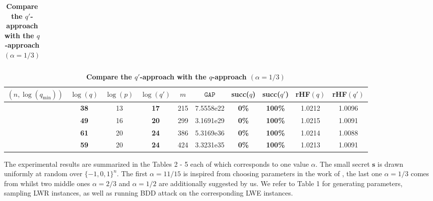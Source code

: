 \documentclass[runningheads]{llncs}
\begin{document}
\begin{table}[pt]
\begin{tabular}{| c | c | c | c | c | c | c | c | c| c|}
	\end{tabular}
	\label{table:4}
	
	
	\caption{\textbf{Compare the $q'$-approach with the $q$-approach $(\alpha=1/3)$}}  
	\centering
	\begin{tabular}{| c | c | c | c | c | c | c | c | c| c|}
		
		\hline
		\hline
		$(n, \log (q_{\text{min}}))$& $\log (q)$ & $\log (p)$  & $\log (q')$ & $m$  &$\mathtt{GAP}$& succ($q$) & succ($q'$)&rHF$(q)$&rHF$(q')$\\	
		\hline
		\hline
		\parbox[t]{13mm}{}&\textbf{38}	&13&\textbf{17}&215&7.5558e22&\textbf{0\%}&\textbf{100\%}&1.0212&1.0096\\
		
		\hline
	
	\parbox[t]{13mm}{}	&\textbf{49}&16&\textbf{20}&299&3.1691e29&\textbf{0\%}&\textbf{100\% }&1.0215&1.0091\\	
		\hline
		\parbox[t]{13mm}{}&\textbf{61}&20&\textbf{24}&386&5.3169e36&\textbf{0\%}&\textbf{100\% }&1.0214&1.0088\\		
		\hline
	\parbox[t]{13mm}{}&\textbf{59}&20&\textbf{24}&424&3.3231e35&\textbf{0\%}&\textbf{100\% }&1.0213&1.0091\\	

		\hline	
	\end{tabular}
	\label{table:5}
\end{table}


The experimental results are summarized in the Tables 2 - 5 each of which corresponds to one value $\alpha$.
The small secret $\mathbf{s}$ is drawn uniformly at random over $\{-1,0,1\}^n$. The first $\alpha=11/15$ is inspired from choosing parameters in the work of \cite{BBGM+17}, the last one $\alpha=1/3$ comes from  \cite{DTV15} whilst two middle ones $\alpha=2/3$ and $\alpha=1/2$ are additionally suggested by us. 
We refer to Table 1 for generating parameters, sampling LWR instances, as well as running BDD attack on the corresponding LWE instances.
\end{document}
